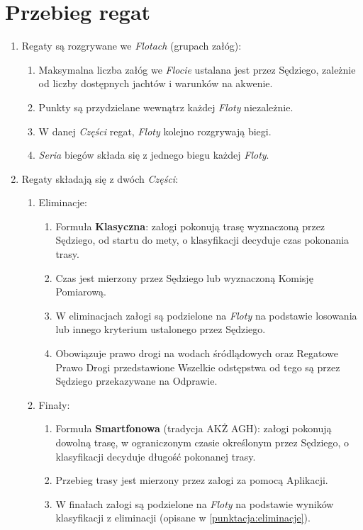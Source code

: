 \documentclass[12pt,a4paper]{article}
\begin{document}
\section{Przebieg regat}
\begin{enumerate}
    \item Regaty są rozgrywane we \textit{Flotach} (grupach załóg):
    \begin{enumerate}
        \item Maksymalna liczba załóg we \textit{Flocie} ustalana jest przez Sędziego, zależnie od liczby dostępnych jachtów i warunków na akwenie.
        \item Punkty są przydzielane wewnątrz każdej \textit{Floty} niezależnie.
        \item W danej \textit{Części} regat, \textit{Floty} kolejno rozgrywają biegi.
        \item \textit{Seria} biegów składa się z jednego biegu każdej \textit{Floty}.
    \end{enumerate}
    \item Regaty składają się z dwóch \textit{Części}:
    \begin{enumerate}
        \item Eliminacje:
        \begin{enumerate}
            \item Formuła \textbf{Klasyczna}: załogi pokonują trasę wyznaczoną przez Sędziego, od startu do mety, o klasyfikacji decyduje czas pokonania trasy.
            \item Czas jest mierzony przez Sędziego lub wyznaczoną Komisję Pomiarową.
            \item W eliminacjach załogi są podzielone na \textit{Floty} na podstawie losowania lub innego kryterium ustalonego przez Sędziego.
            \item Obowiązuje prawo drogi na wodach śródlądowych oraz Regatowe Prawo Drogi przedstawione Wszelkie odstępstwa od tego są przez Sędziego przekazywane na Odprawie. 
        \end{enumerate}
        \item Finały:
        \begin{enumerate}
            \item Formuła \textbf{Smartfonowa} (tradycja AKŻ AGH): załogi pokonują dowolną trasę, w ograniczonym czasie określonym przez Sędziego, o klasyfikacji decyduje długość pokonanej trasy.
            \item Przebieg trasy jest mierzony przez załogi za pomocą Aplikacji.
            \item W finałach załogi są podzielone na \textit{Floty} na podstawie wyników klasyfikacji z eliminacji (opisane w \ref{punktacja:eliminacje}).

\end{enumerate}
\end{enumerate}
\end{enumerate}
\end{document}
